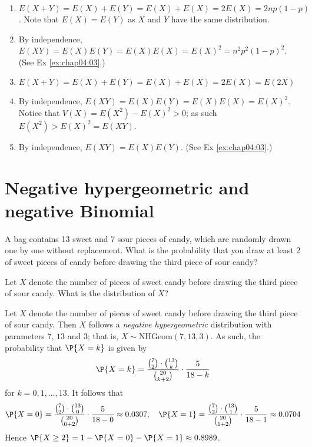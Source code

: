 \begin{exercise}
\begin{solution}
\begin{enumerate}
		\item $E(X + Y) = E(X) + E(Y) = E(X) + E(X) = 2E(X) = 2np(1-p)$. Note that $E(X) = E(Y)$ as $X$ and $Y$ have the same distribution.
		\item By independence, $E(XY) = E(X)E(Y) = E(X)E(X) = E(X)^2 = n^2p^2(1 - p)^2$. (See Ex \ref{ex:chap04:03}.)
		\item $E(X + Y) = E(X) + E(Y) = E(X) + E(X) = 2E(X) = E(2X)$
		\item By independence, $E(XY) = E(X)E(Y) = E(X)E(X) = E(X)^2$. Notice that $V(X) = E(X^2) - E(X)^2 > 0$; as such $E(X^2) > E(X)^2 = E(XY)$.
		\item By independence, $E(XY) = E(X)E(Y)$. (See Ex \ref{ex:chap04:03}.)
	\end{enumerate}
	\end{solution}
\end{exercise}

\section{Negative hypergeometric and negative Binomial}
\label{sec:section-4.2}

\begin{exercise}\label{ex:chap04:07}
	A bag contains 13 sweet and 7 sour pieces of candy, which are randomly drawn one by one without replacement. What is the probability that you draw at least 2 of sweet pieces of candy before drawing the third piece of sour candy?
	\begin{hint}
		Let $X$ denote the number of pieces of sweet candy before drawing the third piece of sour candy. What is the distribution of $X$?
	\end{hint}
	\begin{solution}
		Let $X$ denote the number of pieces of sweet candy before drawing the third piece of sour candy. Then $X$ follows a \emph{negative hypergeometric} distribution with parameters $7$, $13$ and $3$; that is, $X \sim \text{NHGeom}(7, 13, 3)$. As such, the probability that $\P{X = k}$ is given by
		\begin{equation*}
			\P{X = k} = \frac{\binom{7}{2} \cdot \binom{13}{k}}{\binom{20}{k + 2}} \cdot \frac{5}{18 - k}
		\end{equation*}
		for $k = 0, 1, \hdots, 13$. It follows that
		\begin{align*}
			\P{X = 0} = \frac{\binom{7}{2} \cdot \binom{13}{0}}{\binom{20}{0 + 2}} \cdot \frac{5}{18 - 0} \approx 0.0307, \quad \P{X = 1} = \frac{\binom{7}{2} \cdot \binom{13}{1}}{\binom{20}{1 + 2}} \cdot \frac{5}{18 - 1} \approx 0.0704
		\end{align*}
		Hence $\P{X \geq 2} = 1 - \P{X = 0} - \P{X = 1} \approx 0.8989$.
	\end{solution}
\end{exercise}

